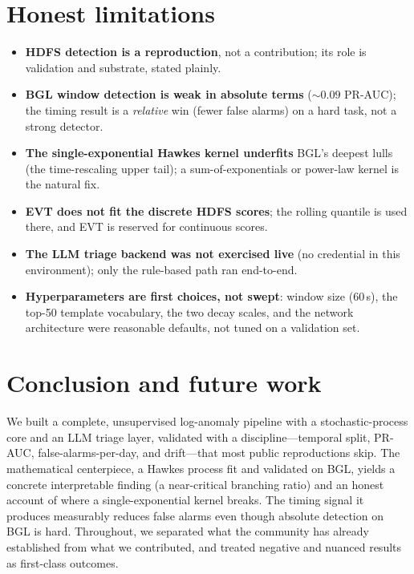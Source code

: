 \documentclass[11pt,a4paper]{article}
\begin{document}
\section{Honest limitations}
\label{sec:limits}
\begin{itemize}[nosep,leftmargin=1.5em]
  \item \textbf{HDFS detection is a reproduction}, not a contribution; its role is
  validation and substrate, stated plainly.
  \item \textbf{BGL window detection is weak in absolute terms} ($\sim$$0.09$
  PR-AUC); the timing result is a \emph{relative} win (fewer false alarms) on a
  hard task, not a strong detector.
  \item \textbf{The single-exponential Hawkes kernel underfits} BGL's deepest lulls
  (the time-rescaling upper tail); a sum-of-exponentials or power-law kernel is the
  natural fix.
  \item \textbf{EVT does not fit the discrete HDFS scores}; the rolling quantile is
  used there, and EVT is reserved for continuous scores.
  \item \textbf{The LLM triage backend was not exercised live} (no credential in
  this environment); only the rule-based path ran end-to-end.
  \item \textbf{Hyperparameters are first choices, not swept}: window size
  ($60$\,s), the top-50 template vocabulary, the two decay scales, and the network
  architecture were reasonable defaults, not tuned on a validation set.
\end{itemize}

\section{Conclusion and future work}
\label{sec:conclusion}
We built a complete, unsupervised log-anomaly pipeline with a stochastic-process
core and an LLM triage layer, validated with a discipline---temporal split,
PR-AUC, false-alarms-per-day, and drift---that most public reproductions skip. The
mathematical centerpiece, a Hawkes process fit and validated on BGL, yields a
concrete interpretable finding (a near-critical branching ratio) and an honest
account of where a single-exponential kernel breaks. The timing signal it produces
measurably reduces false alarms even though absolute detection on BGL is hard.
Throughout, we separated what the community has already established from what we
contributed, and treated negative and nuanced results as first-class outcomes.
\end{document}
